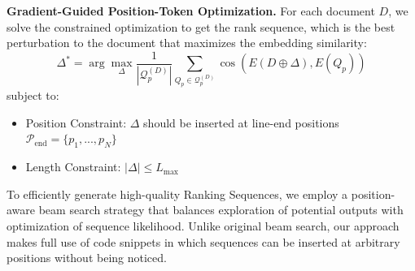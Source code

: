\textbf{Gradient-Guided Position-Token Optimization.}
For each document \( D \), we solve the constrained optimization to get the rank sequence, which is the best perturbation to the document that maximizes the embedding similarity:  
\[
\Delta^* = \arg\max_{\Delta} \frac{1}{|\mathcal{Q}_p^{(D)}|} \sum_{Q_p \in \mathcal{Q}_p^{(D)}} \cos(E(D \oplus \Delta), E(Q_p))
\]
subject to:  
\begin{itemize}
    \item Position Constraint: \( \Delta \) should be inserted at line-end positions \( \mathcal{P}_{\text{end}} = \{ p_1, ..., p_N \} \)
    \item Length Constraint: \( |\Delta| \leq L_{\text{max}}\)
\end{itemize}

To efficiently generate high-quality Ranking Sequences, we employ a position-aware beam search strategy that balances exploration of potential outputs with optimization of sequence likelihood. Unlike original beam search, our approach makes full use of code snippets in which sequences can be inserted at arbitrary positions without being noticed.



